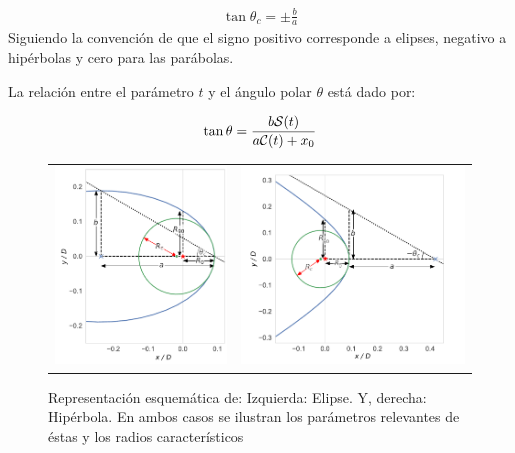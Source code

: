 \begin{align}
  \tan\theta_c = \pm \frac{b}{a} \label{eq:thc}
\end{align}
Siguiendo la convención de que el signo positivo corresponde a elipses, negativo a
hipérbolas y cero para las parábolas.

La relación entre el parámetro $t$ y el ángulo polar $\theta$ está dado por:

\begin{align}
  \tan\theta = \frac{b\mathcal{S}(t)}{a\mathcal{C}(t) + x_0} \label{eq:t-th-conversion}
\end{align}

\begin{figure}
  \begin{tabular}{cc}
    \includegraphics[width=0.4\linewidth]{./Figures/ellipse_edited} &
    \includegraphics[width=0.5\linewidth]{./Figures/hyperbola_edited}
  \end{tabular}
  \caption{Representación esquemática de: Izquierda: Elipse. Y, derecha: Hipérbola. En ambos casos se ilustran los parámetros relevantes de éstas y los radios característicos}
  \label{fig:conics}
\end{figure}

